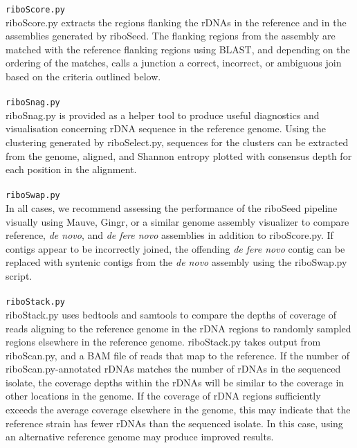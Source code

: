 \documentclass[a4,center,fleqn]{NAR}
\begin{document}
\texttt{riboScore.py}\\
riboScore.py extracts the regions flanking the rDNAs in the reference and in the assemblies generated by riboSeed. The flanking regions from the assembly are matched with the reference flanking regions using BLAST, and depending on the ordering of the matches, calls a junction a correct, incorrect, or ambiguous join based on the criteria outlined below.\\
\\
\texttt{riboSnag.py}\\
riboSnag.py is provided as a helper tool to produce useful diagnostics and visualisation concerning rDNA sequence in the reference genome. Using the clustering generated by riboSelect.py, sequences for the clusters can be extracted from the genome, aligned, and Shannon entropy \cite{Schmitt1997} plotted with consensus depth for each position in the alignment.\\
\\
\texttt{riboSwap.py}\\
In all cases, we recommend assessing the performance of the riboSeed pipeline visually using Mauve\cite{Darling2004,Darling2011}, Gingr\cite{Treangen2014}, or a similar genome assembly visualizer to compare reference, \textit{de novo}, and \textit{de fere novo} assemblies in addition to riboScore.py. If contigs appear to be incorrectly joined, the offending \textit{de fere novo} contig can be replaced with syntenic contigs from the \textit{de novo} assembly using the riboSwap.py script.\\
\\
\texttt{riboStack.py}\\
riboStack.py uses bedtools\cite{Quinlan2010} and samtools\cite{Li2009} to compare the depths of coverage of reads aligning to the reference genome in the rDNA regions to randomly sampled regions elsewhere in the reference genome. riboStack.py takes output from riboScan.py, and a BAM file of reads that map to the reference. If the number of riboScan.py-annotated rDNAs matches the number of rDNAs in the sequenced isolate, the coverage depths within the rDNAs will be similar to the coverage in other locations in the genome. If the coverage of rDNA regions sufficiently exceeds the average coverage elsewhere in the genome, this may indicate that the reference strain has fewer rDNAs than the sequenced isolate. In this case, using an alternative reference genome may produce improved results.


\end{document}
